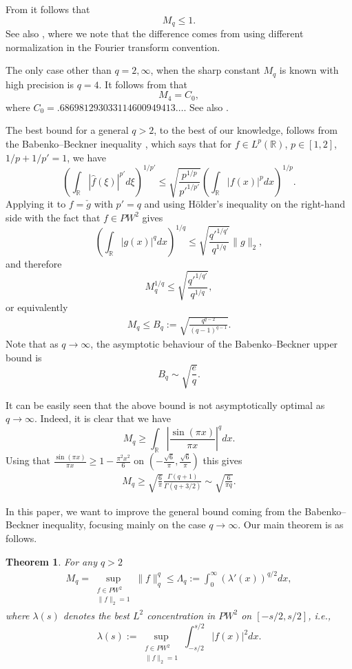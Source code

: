 \documentclass[11pt, a4paper, reqno]{amsart}
\newtheorem{theorem}{Theorem}
\theoremstyle{remark}
\begin{document}
From \cite[Sec. 4.9.53]{Timan1963} it follows that 
$$M_q \leq 1.$$
See also \cite[Eq. (1.14)]{Ganzburg1}, where we note that the difference comes from using different normalization in the Fourier transform convention. 

The only case other than $q=2,\infty$, when the sharp constant $M_q$ is known with high precision is $q=4$. It follows from \cite{Garsia} that
    $$M_4 = C_0,$$
where $C_0 = .686981293033114600949413\ldots$. See also \cite[Eq. (1.16)]{Ganzburg1}.

The best bound for a general $q>2$, to the best of our knowledge, follows from the Babenko--Beckner inequality \cite{Beckner}, which says that for $f\in L^p(\mathbb{R})$, $p\in [1,2]$, $1/p+1/p'=1$, we have
$$\left(\int_{\mathbb{R}}|\hat{f}(\xi)|^{p'}d\xi\right)^{1/p'} \leq \sqrt{\frac{p^{1/p}}{p'^{1/p'}}} \left(\int_{\mathbb{R}}|f(x)|^pdx\right)^{1/p}.$$
Applying it to $f=\check{g}$  with $p'=q$ and using Hölder's inequality on the right-hand side with the fact that $f\in PW^2$ gives 
$$\left(\int_{\mathbb{R}}|g(x)|^q dx\right)^{1/q} \leq \sqrt{\frac{q'^{1/q'}}{q^{1/q}}} \|g\|_2,$$
and therefore 
$$ M_q^{1/q} \leq \sqrt{\frac{q'^{1/q'}}{q^{1/q}}},$$
or equivalently 
\begin{align}\label{BabenkoBeckner}
    M_q \leq B_q := \sqrt{\frac{q^{q-2}}{(q-1)^{q-1}}}.
\end{align}
Note that as $q\to\infty$, the asymptotic behaviour of the Babenko--Beckner upper bound is
$$B_q \sim \sqrt{\frac{e}{q}}.$$

It can be easily seen that the above bound is not asymptotically optimal as $q\to \infty$. Indeed, it is clear that we have
$$M_q \geq \int_{\mathbb{R}} \left|\frac{\sin(\pi x)}{\pi x}\right|^q dx.$$
Using that $\frac{\sin(\pi x)}{\pi x} \geq 1-\frac{\pi^2 x^2}{6}$ on $(-\frac{\sqrt{6}}{\pi}, \frac{\sqrt{6}}{\pi})$ this gives
\begin{align}\label{lowbound}
    M_q \geq \sqrt{\frac{6}{\pi}} \frac{\Gamma(q+1)}{\Gamma(q+3/2)} \sim \sqrt{\frac{6}{\pi q}}.
\end{align}

In this paper, we want to improve the general bound coming from the Babenko--Beckner inequality, focusing mainly on the case $q\to \infty$. Our main theorem is as follows.
\begin{samepage}
\begin{theorem}\label{mainth}
For any $q>2$
    \begin{align*}
    M_q = \sup_{\substack{f\in PW^2\\ \|f\|_2=1}}\|f\|_q^q \leq \Lambda_q := \int_0^{\infty} (\lambda'(x))^{q/2}dx,
    \end{align*}
where $\lambda(s)$ denotes the best $L^2$ concentration in $PW^2$ on $[-s/2,s/2]$, i.e.,
$$\lambda(s):=\sup_{\substack{f\in PW^2\\ \lVert f\rVert_2=1}}
 \int_{-s/2}^{s/2}|f(x)|^2 dx.$$
\end{theorem}
\end{samepage}
\end{document}
